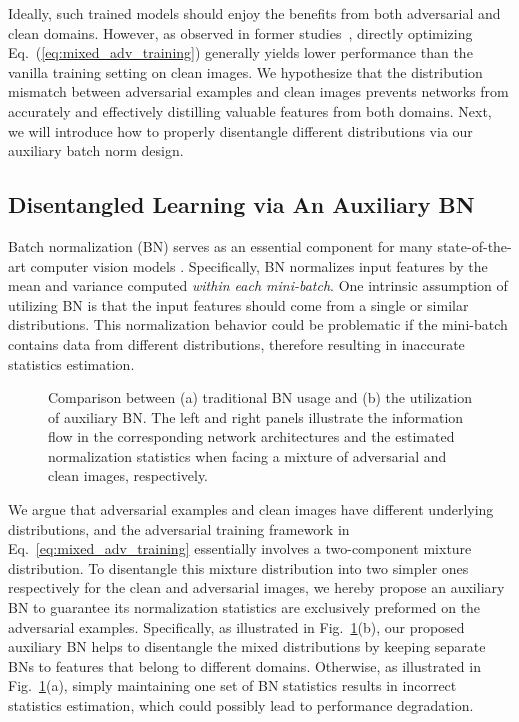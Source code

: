\documentclass[10pt,twocolumn,letterpaper]{article}
\begin{document}
Ideally, such trained models should enjoy the benefits from both adversarial and clean domains. However, as observed in former studies~\cite{Goodfellow2015,Kurakin2017}, directly optimizing Eq.~(\ref{eq:mixed_adv_training}) generally yields lower performance than the vanilla training setting on clean images. We hypothesize that the distribution mismatch between adversarial examples and clean images prevents networks from accurately and effectively distilling valuable features from both domains. Next, we will introduce how to properly disentangle different distributions via our auxiliary batch norm design.


\subsection{Disentangled Learning via An Auxiliary BN}
\label{sec:twoBN}
Batch normalization (BN) \cite{Ioffe2015} serves as an essential component for many state-of-the-art computer vision models \cite{He2016,Huang2016,Szegedy2016a}. Specifically, BN normalizes input features by the mean and variance computed \emph{within each mini-batch}. One intrinsic assumption of utilizing BN is that the input features should come from a single or similar distributions. This normalization behavior could be problematic if the mini-batch contains data from different distributions, therefore resulting in inaccurate statistics estimation. 


\begin{figure}[h!]
\vspace{-1em}
\centering
{}
\caption{Comparison between (a) traditional BN usage and (b) the utilization of auxiliary BN. The left and right panels illustrate the information flow in the corresponding network architectures and the estimated normalization statistics when facing a mixture of adversarial and clean images, respectively.}
\label{fig:ABN} 
\vspace{-0.35em}
\end{figure}



We argue that adversarial examples and clean images have different underlying distributions, and the adversarial training framework in Eq.~\eqref{eq:mixed_adv_training} essentially involves a two-component mixture distribution. 
To  disentangle this mixture distribution into two simpler ones respectively for the clean and adversarial images, we hereby propose an auxiliary BN to guarantee its normalization statistics are exclusively preformed on the adversarial examples. Specifically, as illustrated in Fig.~\ref{fig:ABN}(b), our proposed auxiliary BN helps to disentangle the mixed distributions by keeping separate BNs to features that belong to different domains. Otherwise, as illustrated in Fig.~\ref{fig:ABN}(a), simply maintaining one set of BN statistics results in incorrect statistics estimation, which could possibly lead to performance degradation.
\end{document}
